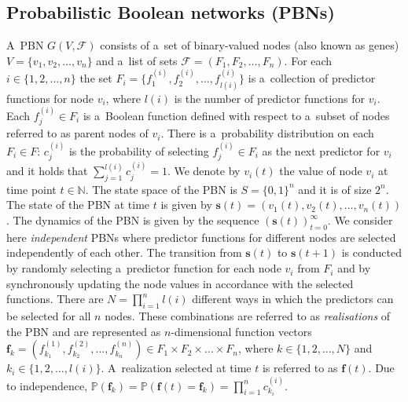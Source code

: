 \documentclass[runningheads,a4paper]{llncs}
\begin{document}
\subsection{Probabilistic Boolean networks (PBNs)}
\label{ssec:pbn}
A~PBN $G(V,\mathcal{F})$ consists of a~set of binary-valued nodes (also known as genes)
$V=\{v_{1},v_{2}, \ldots ,v_{n}\}$ and a~list of sets $\mathcal{F}=(F_{1},F_{2}, \ldots, F_{n})$.
For each $i \in \{1,2,\ldots,n\}$ the set
$F_{i}=\{f_{1}^{(i)},f_{2}^{(i)},\ldots,f_{l(i)}^{(i)}\}$ is a~collection of predictor functions
for node $v_{i}$, where $l(i)$ is the number of predictor functions for $v_{i}$. Each $f_{j}^{(i)}
\in F_{i}$ is a~Boolean function defined with respect to a~subset of nodes referred to as parent
nodes of $v_i$. There is a~probability distribution on each $F_i \in F$: $c_{j}^{(i)}$ is the
probability of selecting $f_j^{(i)} \in F_i$ as the next predictor for $v_i$ and it holds that
$\sum_{j=1}^{l(i)}c_{j}^{(i)}=1$. We denote by $v_{i}(t)$ the value of node $v_{i}$ at time point
$t\in \mathbb{N}$. The state space of the PBN is $S=\{0,1\}^n$ and it is of size $2^n$. The state
of the PBN at time $t$ is given by $\boldsymbol{s}(t)=(v_{1}(t),v_{2}(t),\ldots,v_{n}(t))$. The
dynamics of the PBN is given by the sequence $(\boldsymbol{s}(t))_{t=0}^\infty$. We consider here
\emph{independent} PBNs where predictor functions for different nodes are selected independently
of each other. The transition from $\boldsymbol{s}(t)$ to $\boldsymbol{s}(t+1)$ is conducted by
randomly selecting a~predictor function for each node $v_i$ from $F_i$ and by synchronously
updating the node values in accordance with the selected functions. There are
$N=\prod_{i=1}^{n}l(i)$ different ways in which the predictors can be selected for all $n$ nodes.
These combinations are referred to as \emph{realisations} of the PBN and are represented as
$n$-dimensional function vectors $\boldsymbol{f}_k =
(f_{k_1}^{(1)},f_{k_2}^{(2)},\ldots,f_{k_n}^{(n)})\in F_1\times F_2\times \ldots \times F_n$,
where $k\in \{1,2,\ldots,N\}$ and $k_i \in \{1,2,\ldots,l(i)\}$. A~realization selected at time
$t$ is referred to as $\boldsymbol{f}(t)$. Due to independence, $\mathbb{P}(\boldsymbol{f}_k) =
\mathbb{P}(\boldsymbol{f}(t) = \boldsymbol{f}_k) = \prod_{i=1}^n c_{k_i}^{(i)}$.
\end{document}
